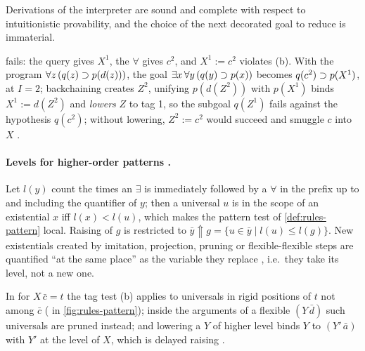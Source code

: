 \begin{proposition}\label{prop:rules-ui}
Derivations of the interpreter are sound and complete with respect to intuitionistic provability, and the choice of the next decorated goal to reduce is immaterial.
\end{proposition}

\begin{example}\label{ex:rules-scope}
 fails: the query gives $X^1$, the $\forall$ gives $c^2$, and $X^1:=c^2$ violates (b).
With the program $\forall z\,(q(z)\supset p(d(z)))$, the goal $\exists x\,\forall y\,(q(y)\supset p(x))$ becomes $q(c^2)\supset p(X^1)$, at $I=2$; backchaining creates $Z^2$, unifying $p(d(Z^2))$ with $p(X^1)$ binds $X^1:=d(Z^2)$ and \emph{lowers} $Z$ to tag 1, so the subgoal $q(Z^1)$ fails against the hypothesis $q(c^2)$; without lowering, $Z^2:=c^2$ would succeed and smuggle $c$ into $X$ \cite[p.\,16]{NadathurJayaramanKwon1995}.
\end{example}

\paragraph{Levels for higher-order patterns \cite[p.\,8--9]{NadathurLinnell2005}.}
Let $l(y)$ count the times an $\exists$ is immediately followed by a $\forall$ in the prefix up to and including the quantifier of $y$; then a universal $u$ is in the scope of an existential $x$ iff $l(x)<l(u)$, which makes the pattern test of \cref{def:rules-pattern} local.
Raising of $g$ is restricted to $\bar y{\Uparrow}g=\{u\in\bar y\mid l(u)\le l(g)\}$.
New existentials created by imitation, projection, pruning or flexible-flexible steps are quantified \enquote{at the same place} as the variable they replace , i.e.\ they take its level, not a new one.

\begin{remark}\label{rem:rules-holevel}
In  for $X\,\bar c=t$ the tag test (b) applies to universals in rigid positions of $t$ not among $\bar c$ ( in \cref{fig:rules-pattern}); inside the arguments of a flexible $(Y\,\bar d)$ such universals are pruned instead; and lowering a $Y$ of higher level binds $Y$ to $(Y'\,\bar a)$ with $Y'$ at the level of $X$, which is delayed raising .
\end{remark}

